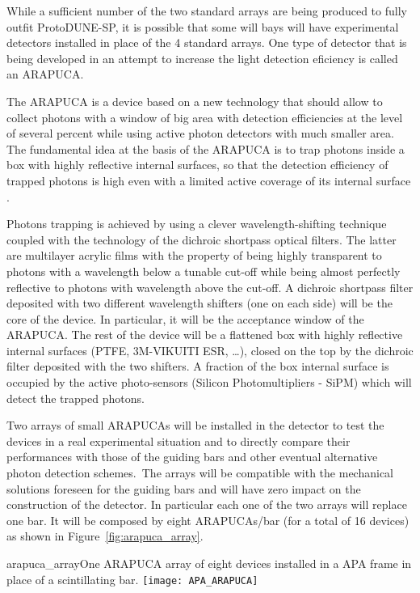 While a sufficient number of the two standard arrays are being produced to fully outfit ProtoDUNE-SP, it is possible that some will bays will have experimental detectors installed in place 
of the 4 standard arrays. One type of detector that is being developed in an attempt to increase the light detection eficiency is called an ARAPUCA.

The ARAPUCA is a device based on a new technology that should allow to collect photons with a window of big area with detection efficiencies at the level of several percent while using 
active photon detectors with much smaller area.
The fundamental idea at the basis of the ARAPUCA is to trap photons inside a box with highly reflective internal surfaces, so that the detection efficiency of trapped photons is high even with a  limited active coverage of its internal surface \cite{arapuca_jinst}.

Photons trapping is achieved by using a clever wavelength-shifting technique coupled with the technology of the dichroic shortpass optical filters. The latter are multilayer acrylic films 
with the  property of being highly transparent to photons with a wavelength below a tunable cut-off while being almost perfectly reflective to photons with wavelength above the cut-off. 
A dichroic shortpass filter deposited with two different wavelength shifters (one on each side) will be the core of the device. In particular, it will be the acceptance window of the 
ARAPUCA. The rest of the device will be a flattened box with highly reflective internal surfaces (PTFE, 3M-VIKUITI ESR, \dots), closed on the top by the 
dichroic  filter deposited with the two shifters. A fraction of the box internal surface is occupied by the active photo-sensors (Silicon Photomultipliers - SiPM) which will detect the trapped photons.

Two arrays of small ARAPUCAs will be installed in the detector %
to test the devices in a real experimental situation and to directly compare their performances with those of the guiding 
bars and other eventual alternative photon detection schemes.\
The arrays will be compatible with the mechanical solutions foreseen for the guiding bars and will have zero impact on the construction of the detector. In particular each one of the two 
arrays will replace one bar. It will be composed by eight ARAPUCAs/bar (for a total of 16 devices)  as shown in Figure~\ref{fig:arapuca_array}.
\begin{cdrfigure}
  {arapuca_array}{One ARAPUCA array of eight devices installed in a APA frame in place of a scintillating bar.}
\texttt{[image: APA\_ARAPUCA]}
\end{cdrfigure}

